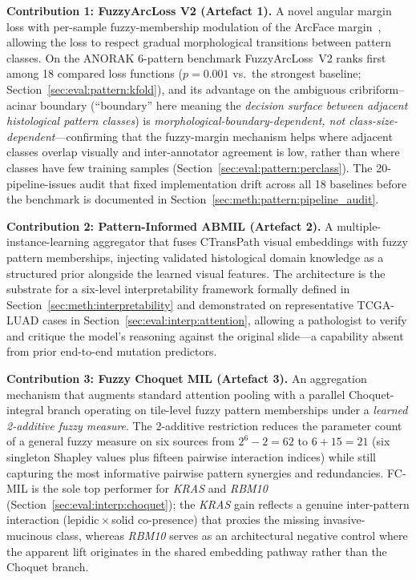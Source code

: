 \textbf{Contribution 1: FuzzyArcLoss V2 (Artefact 1).}
A novel angular margin loss with per-sample fuzzy-membership
modulation of the ArcFace
margin~\cite{deng2019arcface,wang2018cosface,liu2017sphereface},
allowing the loss to respect gradual morphological transitions
between pattern classes.
On the ANORAK 6-pattern benchmark FuzzyArcLoss~V2 ranks first among
18 compared loss functions ($p = 0.001$ vs.\ the strongest baseline;
Section~\ref{sec:eval:pattern:kfold}), and its advantage on the
ambiguous cribriform--acinar boundary
(``boundary'' here meaning the \emph{decision surface between
adjacent histological pattern classes}) is
\emph{morphological-boundary-dependent, not
class-size-dependent}---confirming that the fuzzy-margin
mechanism helps where adjacent classes overlap visually and
inter-annotator agreement is low, rather than where classes
have few training samples
(Section~\ref{sec:eval:pattern:perclass}).
The 20-pipeline-issues audit that fixed implementation drift
across all 18 baselines before the benchmark is documented in
Section~\ref{sec:meth:pattern:pipeline_audit}.

\textbf{Contribution 2: Pattern-Informed ABMIL (Artefact 2).}
A multiple-instance-learning aggregator that fuses CTransPath visual
embeddings with fuzzy pattern memberships, injecting validated
histological domain knowledge as a structured prior alongside the
learned visual features.
The architecture is the substrate for a six-level interpretability
framework formally defined in
Section~\ref{sec:meth:interpretability} and demonstrated on
representative TCGA-LUAD cases in
Section~\ref{sec:eval:interp:attention}, allowing a pathologist to
verify and critique the model's reasoning against the original
slide---a capability absent from prior end-to-end mutation
predictors.

\textbf{Contribution 3: Fuzzy Choquet MIL (Artefact 3).}
An aggregation mechanism that augments standard attention pooling
with a parallel Choquet-integral branch operating on tile-level
fuzzy pattern memberships under a \emph{learned 2-additive fuzzy
measure}.
The 2-additive restriction reduces the parameter count of a general
fuzzy measure on six sources from $2^6 - 2 = 62$ to $6 + 15 = 21$
(six singleton Shapley values plus fifteen pairwise interaction
indices) while still capturing the most informative pairwise
pattern synergies and redundancies.
FC-MIL is the sole top performer for \textit{KRAS} and
\textit{RBM10} (Section~\ref{sec:eval:interp:choquet}); the
\textit{KRAS} gain reflects a genuine inter-pattern interaction
(lepidic\,$\times$\,solid co-presence) that proxies the missing
invasive-mucinous class, whereas \textit{RBM10} serves as an
architectural negative control where the apparent lift originates in
the shared embedding pathway rather than the Choquet branch.

